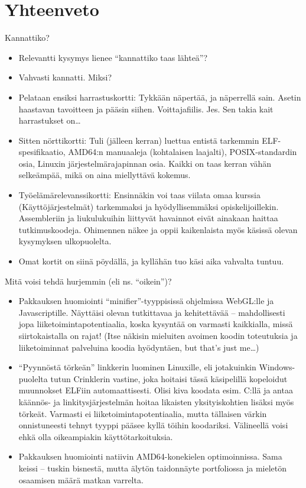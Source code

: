 \documentclass[pdf,10pt,handout]{beamer}
\begin{document}
\section{Yhteenveto}
\begin{frame}{Kannattiko?}
  \begin{itemize}
  \item Relevantti kysymys lienee ``kannattiko taas lähteä''?
  \item Vahvasti kannatti. Miksi?
  \item Pelataan ensiksi harrastuskortti: Tykkään näpertää, ja
    näperrellä sain. Asetin haastavan tavoitteen ja pääsin
    siihen. Voittajafiilis. Jes. Sen takia kait harrastukset
    on\ldots
  \item Sitten nörttikortti: Tuli (jälleen kerran) luettua entistä
    tarkemmin ELF-spesifikaatio, AMD64:n manuaaleja (kohtalaisen
    laajalti), POSIX-standardin osia, Linuxin järjestelmärajapinnan
    osia. Kaikki on taas kerran vähän selkeämpää, mikä on aina
    miellyttävä kokemus.
  \item Työelämärelevanssikortti: Ensinnäkin voi taas viilata omaa
    kurssia (Käyttöjärjestelmät) tarkemmaksi ja hyödyllisemmäksi
    opiskelijoillekin. Assembleriin ja liukulukuihin liittyvät
    havainnot eivät ainakaan haittaa tutkimuskoodeja. Ohimennen näkee
    ja oppii kaikenlaista myös käsissä olevan kysymyksen ulkopuolelta.
  \item Omat kortit on siinä pöydällä, ja kyllähän tuo käsi aika
    vahvalta tuntuu.
  \end{itemize}
\end{frame}

\begin{frame}{Mitä voisi tehdä hurjemmin (eli ns. ``oikein'')?}
  \begin{itemize}
    \item Pakkauksen huomiointi ``minifier''-tyyppisissä ohjelmissa
      WebGL:lle ja Javascriptille. Näyttäisi olevan tutkittavaa ja
      kehitettävää -- mahdollisesti jopa liiketoimintapotentiaalia,
      koska kysyntää on varmasti kaikkialla, missä siirtokaistalla on
      rajat! (Itse näkisin mieluiten avoimen koodin toteutuksia ja
      liiketoiminnat palveluina koodia hyödyntäen, but that's just
      me\ldots)
    \item ``Pyynnöstä törkeän'' linkkerin luominen Linuxille, eli
      jotakuinkin Windows-puolelta tutun Crinklerin vastine, joka
      hoitaisi tässä käsipelillä kopeloidut muunnokset ELFiin
      automaattisesti. Olisi kiva koodata esim. C:llä ja antaa
      käännös- ja linkitysjärjestelmän hoitaa likaisten
      yksityiskohtien lisäksi myös törkeät. Varmasti ei
      liiketoimintapotentiaalia, mutta tällaisen värkin onnistuneesti
      tehnyt tyyppi pääsee kyllä töihin koodariksi. Välineellä voisi
      ehkä olla oikeampiakin käyttötarkoituksia.
    \item Pakkauksen huomiointi natiivin AMD64-konekielen
      optimoinnissa. Sama keissi -- tuskin bisnestä, mutta älytön
      taidonnäyte portfoliossa ja mieletön osaamisen määrä matkan
      varrelta.
  \end{itemize}
\end{frame}
\end{document}
